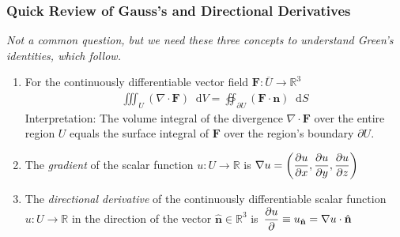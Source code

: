 \documentclass[11pt, a4paper]{article}
\newcommand{\question}[1]{\textit{#1}\vspace{2mm}}
\renewcommand{\div}{\nabla \cdot}
\renewcommand{\grad}{\nabla}
\newcommand{\R}{\mathbb{R}} %
\newcommand{\diff}{\mathop{}\!\mathrm{d}} %
\newcommand{\nhat}{\hat{\mathbf{n}}} %
\begin{document}
\subsubsection{Quick Review of Gauss's and Directional Derivatives}
\question{Not a common question, but we need these three concepts to understand Green's identities, which follow.}
\begin{enumerate}
	\item For the continuously differentiable vector field $ \bm{F} : \overline{U} \to \R^3  $
	\begin{align*}
		 \iiint_{U} (\div{\bm{F}}) \diff V = \oiint_{\partial U} (\bm{F} \cdot \bm{n}) \diff S
	\end{align*}
	Interpretation: The volume integral of the divergence $ \div{\bm{F}} $ over the entire region $ U $ equals the surface integral of $ \bm{F} $ over the region's boundary $ \partial U $.
	
	\item The \textit{gradient} of the scalar function $ u: U \to \R $ is $ \displaystyle{\grad{u} = \left(\pdv{u}{x}, \pdv{u}{y}, \pdv{u}{z} \right)} $
	
	\item The \textit{directional derivative} of the continuously differentiable scalar function $ u: U \to \R $ in the direction of the vector $ \nhat \in \R^{3} $ is $\, \displaystyle{\pdv{u}{} \equiv u_{\nhat} = \grad{u} \cdot \nhat} $
\end{enumerate}
\end{document}
